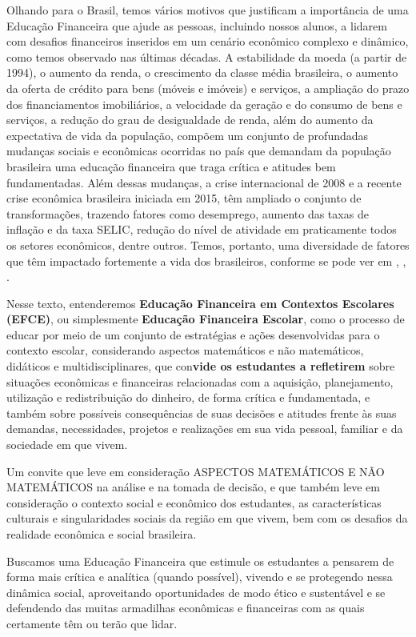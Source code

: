 \begin{apresentacao}
Olhando para o Brasil, temos vários motivos que justificam a importância de uma Educação Financeira que ajude as pessoas, incluindo nossos alunos, a lidarem com desafios financeiros inseridos em um cenário econômico complexo e dinâmico, como temos observado nas últimas décadas. A estabilidade da moeda (a partir de 1994), o aumento da renda, o crescimento da classe média brasileira, o aumento da oferta de crédito para bens (móveis e imóveis) e serviços, a ampliação do prazo dos financiamentos imobiliários, a velocidade da geração e do consumo de bens e serviços, a redução do grau de desigualdade de renda, além do aumento da expectativa de vida da população, compõem um conjunto de profundadas mudanças sociais e econômicas ocorridas no país que demandam da população brasileira uma educação financeira que traga crítica e atitudes bem fundamentadas. Além dessas mudanças, a crise internacional de 2008 e a recente crise econômica brasileira iniciada em 2015, têm ampliado o conjunto de transformações, trazendo fatores como desemprego, aumento das taxas de inflação e da taxa SELIC, redução do nível de atividade em praticamente todos os setores econômicos, dentre outros. Temos, portanto, uma diversidade de fatores que têm impactado fortemente a vida dos brasileiros, conforme se pode ver em \cite{neri2010}, \cite{PNAD2010}, \cite{leitao2011}.

Nesse texto, entenderemos \textbf{Educação Financeira em Contextos Escolares (EFCE)}, ou simplesmente \textbf{Educação Financeira Escolar}, como o processo de educar por meio de um conjunto de estratégias e ações desenvolvidas para o contexto escolar, considerando aspectos matemáticos e não matemáticos, didáticos e multidisciplinares, que con\textbf{vide os estudantes a refletirem} sobre situações econômicas e financeiras relacionadas com a aquisição, planejamento, utilização e redistribuição do dinheiro, de forma crítica e fundamentada, e também sobre possíveis consequências de suas decisões e atitudes frente às suas demandas, necessidades, projetos e realizações em sua vida pessoal, familiar e da sociedade em que vivem.

Um convite que leve em consideração ASPECTOS MATEMÁTICOS E NÃO MATEMÁTICOS na análise e na tomada de decisão, e que também leve em consideração o contexto social e econômico dos estudantes, as características culturais e singularidades sociais da região em que vivem, bem com os desafios da realidade econômica e social brasileira.

Buscamos uma Educação Financeira que estimule os estudantes a pensarem de forma mais crítica e analítica (quando possível), vivendo e se protegendo nessa dinâmica social, aproveitando oportunidades de modo ético e sustentável e se defendendo das muitas armadilhas econômicas e financeiras com as quais certamente têm ou terão que lidar. 


\end{apresentacao}
